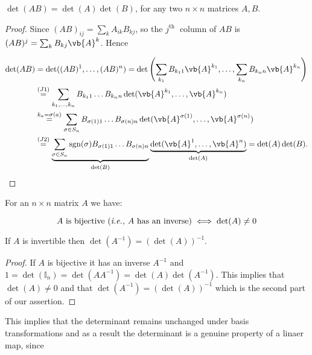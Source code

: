 \documentclass[a4paper,12pt]{report}
\begin{document}
\begin{theorem}
\(\det (AB) = \det (A) \det (B)\), for any two \(n \times  n\) matrices \(A, B\).   
\end{theorem}

\begin{proof}
Since \((AB)_{ij} = \sum_{k}^{} A_{ik}B_{kj}   \), so the \(j^{\text{th }} \) column of \(AB\) is \((AB)^{j} = \sum_{k}^{} B_{kj}\vb{A} ^{k}\). Hence

\begin{equation}
    \begin{aligned}
    \det(AB) &= \det((AB)^1, \ldots, (AB)^n) = \det\left(\sum_{k_1} B_{k_1 1} \vb{A} ^{k_1}, \ldots, \sum_{k_n} B_{k_n n} \vb{A} ^{k_n}\right) \\
    &\overset{(J1)}{=} \sum_{k_1, \ldots, k_n} B_{k_1 1} \ldots B_{k_n n} \det(\vb{A} ^{k_1}, \ldots, \vb{A} ^{k_n}) \\
    &\overset{k_a = \sigma(a)}{=} \sum_{\sigma \in S_n} B_{\sigma(1)1} \ldots B_{\sigma(n)n} \det(\vb{A} ^{\sigma(1)}, \ldots, \vb{A} ^{\sigma(n)}) \\
    &\overset{(J2)}{=} \underbrace{\sum_{\sigma \in S_n} \operatorname{sgn}(\sigma) B_{\sigma(1)1} \ldots B_{\sigma(n)n}}_{\det (B)} \underbrace{\det(\vb{A} ^1, \ldots, \vb{A} ^n)}_{\det(A)} = \det(A) \det(B).
    \end{aligned}
\end{equation}
\end{proof}

\begin{corollary}\label{invertibledeterminant} 

For an \(n \times n\) matrix \(A\) we have:

\begin{equation}
    A \text{ is bijective (\textit{i.e.,} \(A\) has an inverse)} \iff \det (A) \neq 0  
\end{equation}

If \(A\) is invertible then \(\det (A^{-1} ) = (\det (A))^{-1} \). 
  
\end{corollary}

\begin{proof}
If $A$ is bijective it has an inverse $A^{-1}$ and $1 = \det(\mathbb{I}_n) = \det(AA^{-1}) = \det(A) \det(A^{-1})$. This implies that $\det(A) \neq 0$ and that $\det(A^{-1}) = (\det(A))^{-1}$ which is the second part of our assertion.
\end{proof}

This implies that the determinant remains unchanged under basis transformations and as a result the determinant is a genuine property of a linaer map, since
\end{document}
